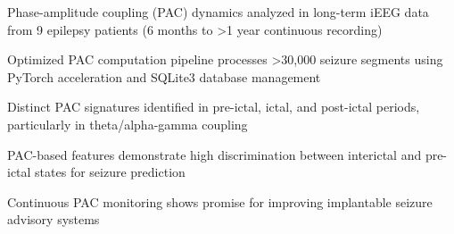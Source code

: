 \begin{highlights}

\item Phase-amplitude coupling (PAC) dynamics analyzed in long-term iEEG data from 9 epilepsy patients (6 months to >1 year continuous recording)

\item Optimized PAC computation pipeline processes >30,000 seizure segments using PyTorch acceleration and SQLite3 database management

\item Distinct PAC signatures identified in pre-ictal, ictal, and post-ictal periods, particularly in theta/alpha-gamma coupling

\item PAC-based features demonstrate high discrimination between interictal and pre-ictal states for seizure prediction

\item Continuous PAC monitoring shows promise for improving implantable seizure advisory systems

\end{highlights}